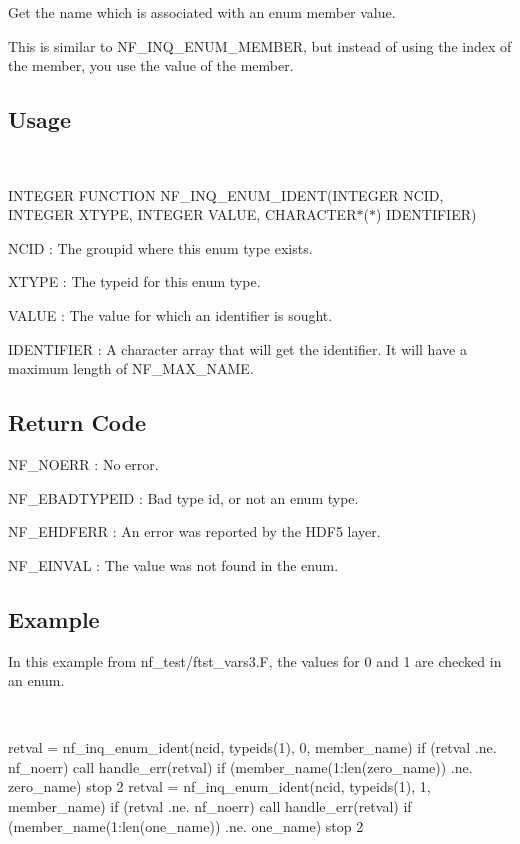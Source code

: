 Get the name which is associated with an enum member value.

This is similar to N\+F\+\_\+\+I\+N\+Q\+\_\+\+E\+N\+U\+M\+\_\+\+M\+E\+M\+B\+ER, but instead of using the index of the member, you use the value of the member.

\subsection*{Usage }

 

I\+N\+T\+E\+G\+ER F\+U\+N\+C\+T\+I\+ON N\+F\+\_\+\+I\+N\+Q\+\_\+\+E\+N\+U\+M\+\_\+\+I\+D\+E\+NT(I\+N\+T\+E\+G\+ER N\+C\+ID, I\+N\+T\+E\+G\+ER X\+T\+Y\+PE, I\+N\+T\+E\+G\+ER V\+A\+L\+UE, C\+H\+A\+R\+A\+C\+T\+E\+R$\ast$($\ast$) I\+D\+E\+N\+T\+I\+F\+I\+ER)

{\ttfamily N\+C\+ID} \+: The groupid where this enum type exists.

{\ttfamily X\+T\+Y\+PE} \+: The typeid for this enum type.

{\ttfamily V\+A\+L\+UE} \+: The value for which an identifier is sought.

{\ttfamily I\+D\+E\+N\+T\+I\+F\+I\+ER} \+: A character array that will get the identifier. It will have a maximum length of N\+F\+\_\+\+M\+A\+X\+\_\+\+N\+A\+ME.

\subsection*{Return Code }

{\ttfamily N\+F\+\_\+\+N\+O\+E\+RR} \+: No error.

{\ttfamily N\+F\+\_\+\+E\+B\+A\+D\+T\+Y\+P\+E\+ID} \+: Bad type id, or not an enum type.

{\ttfamily N\+F\+\_\+\+E\+H\+D\+F\+E\+RR} \+: An error was reported by the H\+D\+F5 layer.

{\ttfamily N\+F\+\_\+\+E\+I\+N\+V\+AL} \+: The value was not found in the enum.

\subsection*{Example }

In this example from nf\+\_\+test/ftst\+\_\+vars3.\+F, the values for 0 and 1 are checked in an enum.

 

\begin{DoxyVerb}  retval = nf_inq_enum_ident(ncid, typeids(1), 0, member_name)
  if (retval .ne. nf_noerr) call handle_err(retval)
  if (member_name(1:len(zero_name)) .ne. zero_name) stop 2
  retval = nf_inq_enum_ident(ncid, typeids(1), 1, member_name)
  if (retval .ne. nf_noerr) call handle_err(retval)
  if (member_name(1:len(one_name)) .ne. one_name) stop 2
\end{DoxyVerb}


